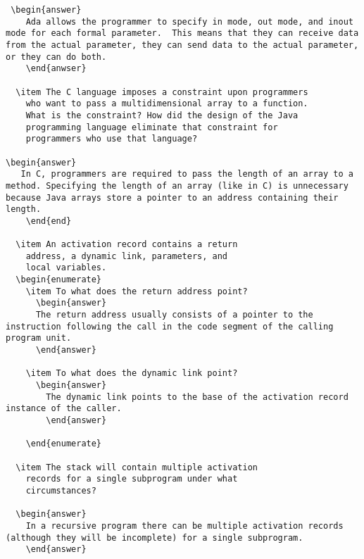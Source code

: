 \begin{enumerate}
\begin{answer}
\begin{lstlisting}
 \begin{answer}
    Ada allows the programmer to specify in mode, out mode, and inout mode for each formal parameter.  This means that they can receive data from the actual parameter, they can send data to the actual parameter, or they can do both.
    \end{anwser}

  \item The C language imposes a constraint upon programmers
    who want to pass a multidimensional array to a function.
    What is the constraint? How did the design of the Java
    programming language eliminate that constraint for 
    programmers who use that language?

\begin{answer}
   In C, programmers are required to pass the length of an array to a method. Specifying the length of an array (like in C) is unnecessary because Java arrays store a pointer to an address containing their length.
    \end{end}

  \item An activation record contains a return
    address, a dynamic link, parameters, and
    local variables.
  \begin{enumerate}
    \item To what does the return address point?
      \begin{answer}
      The return address usually consists of a pointer to the instruction following the call in the code segment of the calling program unit.
      \end{answer}

    \item To what does the dynamic link point?
      \begin{answer}
        The dynamic link points to the base of the activation record instance of the caller.
        \end{answer}

    \end{enumerate}

  \item The stack will contain multiple activation
    records for a single subprogram under what
    circumstances?

  \begin{answer}
    In a recursive program there can be multiple activation records (although they will be incomplete) for a single subprogram.
    \end{answer}


\end{lstlisting}
\end{answer}
\end{enumerate}
